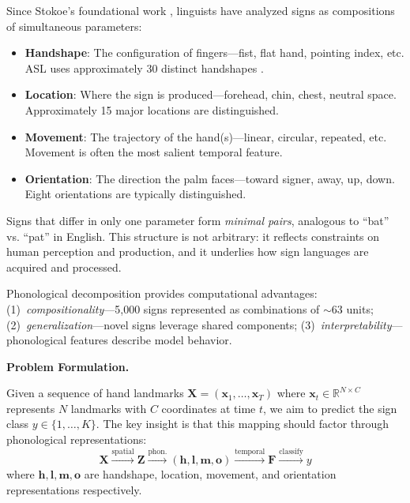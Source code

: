 \documentclass{article}
\theoremstyle{definition}
\theoremstyle{remark}
\begin{document}
Since Stokoe's foundational work \citep{stokoe1960sign}, linguists have analyzed signs as compositions of simultaneous parameters:
\begin{itemize}[nosep,topsep=2pt]
\item \textbf{Handshape}: The configuration of fingers---fist, flat hand, pointing index, etc. ASL uses approximately 30 distinct handshapes \citep{battison1978lexical}.
\item \textbf{Location}: Where the sign is produced---forehead, chin, chest, neutral space. Approximately 15 major locations are distinguished.
\item \textbf{Movement}: The trajectory of the hand(s)---linear, circular, repeated, etc. Movement is often the most salient temporal feature.
\item \textbf{Orientation}: The direction the palm faces---toward signer, away, up, down. Eight orientations are typically distinguished.
\end{itemize}

Signs that differ in only one parameter form \textit{minimal pairs}, analogous to ``bat'' vs. ``pat'' in English. This structure is not arbitrary: it reflects constraints on human perception and production, and it underlies how sign languages are acquired and processed.

Phonological decomposition provides computational advantages: (1)~\textit{compositionality}---5,000 signs represented as combinations of $\sim$63 units; (2)~\textit{generalization}---novel signs leverage shared components; (3)~\textit{interpretability}---phonological features describe model behavior.

\textbf{Problem Formulation.}

Given a sequence of hand landmarks $\mathbf{X} = (\mathbf{x}_1, \ldots, \mathbf{x}_T)$ where $\mathbf{x}_t \in \mathbb{R}^{N \times C}$ represents $N$ landmarks with $C$ coordinates at time $t$, we aim to predict the sign class $y \in \{1, \ldots, K\}$. The key insight is that this mapping should factor through phonological representations:
\begin{equation}
\mathbf{X} \xrightarrow{\text{spatial}} \mathbf{Z} \xrightarrow{\text{phon.}} (\mathbf{h}, \mathbf{l}, \mathbf{m}, \mathbf{o}) \xrightarrow{\text{temporal}} \mathbf{F} \xrightarrow{\text{classify}} y
\end{equation}
where $\mathbf{h}, \mathbf{l}, \mathbf{m}, \mathbf{o}$ are handshape, location, movement, and orientation representations respectively.
\end{document}
